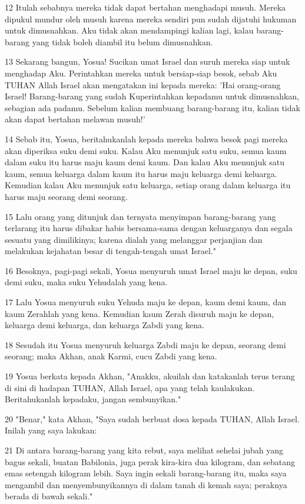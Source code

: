 \par 12 Itulah sebabnya mereka tidak dapat bertahan menghadapi musuh. Mereka dipukul mundur oleh musuh karena mereka sendiri pun sudah dijatuhi hukuman untuk dimusnahkan. Aku tidak akan mendampingi kalian lagi, kalau barang-barang yang tidak boleh diambil itu belum dimusnahkan.
\par 13 Sekarang bangun, Yosua! Sucikan umat Israel dan suruh mereka siap untuk menghadap Aku. Perintahkan mereka untuk bersiap-siap besok, sebab Aku TUHAN Allah Israel akan mengatakan ini kepada mereka: 'Hai orang-orang Israel! Barang-barang yang sudah Kuperintahkan kepadamu untuk dimusnahkan, sebagian ada padamu. Sebelum kalian membuang barang-barang itu, kalian tidak akan dapat bertahan melawan musuh!'
\par 14 Sebab itu, Yosua, beritahukanlah kepada mereka bahwa besok pagi mereka akan diperiksa suku demi suku. Kalau Aku menunjuk satu suku, semua kaum dalam suku itu harus maju kaum demi kaum. Dan kalau Aku menunjuk satu kaum, semua keluarga dalam kaum itu harus maju keluarga demi keluarga. Kemudian kalau Aku menunjuk satu keluarga, setiap orang dalam keluarga itu harus maju seorang demi seorang.
\par 15 Lalu orang yang ditunjuk dan ternyata menyimpan barang-barang yang terlarang itu harus dibakar habis bersama-sama dengan keluarganya dan segala sesuatu yang dimilikinya; karena dialah yang melanggar perjanjian dan melakukan kejahatan besar di tengah-tengah umat Israel."
\par 16 Besoknya, pagi-pagi sekali, Yosua menyuruh umat Israel maju ke depan, suku demi suku, maka suku Yehudalah yang kena.
\par 17 Lalu Yosua menyuruh suku Yehuda maju ke depan, kaum demi kaum, dan kaum Zerahlah yang kena. Kemudian kaum Zerah disuruh maju ke depan, keluarga demi keluarga, dan keluarga Zabdi yang kena.
\par 18 Sesudah itu Yosua menyuruh keluarga Zabdi maju ke depan, seorang demi seorang; maka Akhan, anak Karmi, cucu Zabdi yang kena.
\par 19 Yosua berkata kepada Akhan, "Anakku, akuilah dan katakanlah terus terang di sini di hadapan TUHAN, Allah Israel, apa yang telah kaulakukan. Beritahukanlah kepadaku, jangan sembunyikan."
\par 20 "Benar," kata Akhan, "Saya sudah berbuat dosa kepada TUHAN, Allah Israel. Inilah yang saya lakukan:
\par 21 Di antara barang-barang yang kita rebut, saya melihat sehelai jubah yang bagus sekali, buatan Babilonia, juga perak kira-kira dua kilogram, dan sebatang emas setengah kilogram lebih. Saya ingin sekali barang-barang itu, maka saya mengambil dan menyembunyikannya di dalam tanah di kemah saya; peraknya berada di bawah sekali."
